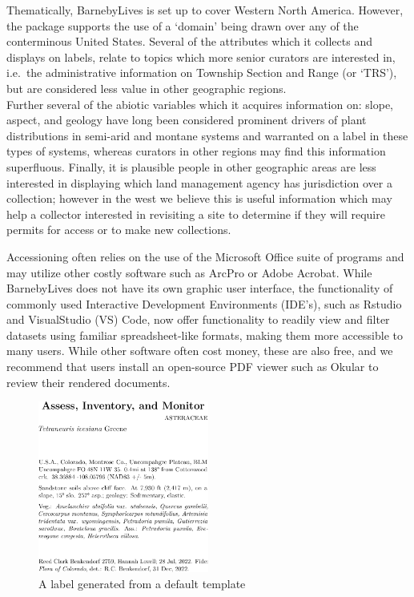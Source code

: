 \documentclass[
]{article}
\begin{document}
Thematically, BarnebyLives is set up to cover Western North America.
However, the package supports the use of a `domain' being drawn over any
of the conterminous United States. Several of the attributes which it
collects and displays on labels, relate to topics which more senior
curators are interested in, i.e.~the administrative information on
Township Section and Range (or `TRS'), but are considered less value in
other geographic regions.\\
Further several of the abiotic variables which it acquires information
on: slope, aspect, and geology have long been considered prominent
drivers of plant distributions in semi-arid and montane systems and
warranted on a label in these types of systems, whereas curators in
other regions may find this information superfluous. Finally, it is
plausible people in other geographic areas are less interested in
displaying which land management agency has jurisdiction over a
collection; however in the west we believe this is useful information
which may help a collector interested in revisiting a site to determine
if they will require permits for access or to make new collections.

Accessioning often relies on the use of the Microsoft Office suite of
programs and may utilize other costly software such as ArcPro or Adobe
Acrobat. While BarnebyLives does not have its own graphic user
interface, the functionality of commonly used Interactive Development
Environments (IDE's), such as Rstudio and VisualStudio (VS) Code, now
offer functionality to readily view and filter datasets using familiar
spreadsheet-like formats, making them more accessible to many users.
While other software often cost money, these are also free, and we
recommend that users install an open-source PDF viewer such as Okular to
review their rendered documents.

\begin{figure}
\centering
\includegraphics[width=0.5\textwidth,height=\textheight]{../graphics/plots/RCB2759.png}
\caption{A label generated from a default template}
\end{figure}
\end{document}
